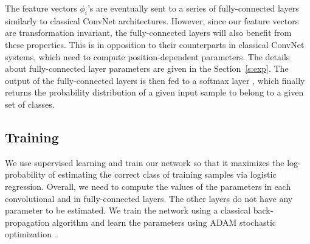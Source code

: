 \documentclass[10pt,journal,compsoc]{IEEEtran}
\begin{document}
	The feature vectors $\phi_i$'s are eventually sent to a series of fully-connected layers similarly to classical ConvNet architectures. However, since our feature vectors are transformation invariant, the fully-connected layers will also benefit from these properties. This is in opposition to their counterparts in classical ConvNet systems, which need to compute position-dependent parameters. The details about fully-connected layer parameters are given in the Section~\ref{s:exp}. The output of the fully-connected layers is then fed to a softmax layer \cite{bb:bishop:2006softmax}, which finally returns the probability distribution of a given input sample to belong to a given set of classes. 
	
	\subsection{Training}
	We use supervised learning and train our network so that it maximizes the log-probability of estimating the correct class of training samples via logistic regression. Overall, we need to compute the values of the parameters in each convolutional and in fully-connected layers. The other layers do not have any parameter to be estimated.  We train the network using a classical back-propagation algorithm and learn the parameters using ADAM stochastic optimization~\cite{bb:adam}.
	
\end{document}
